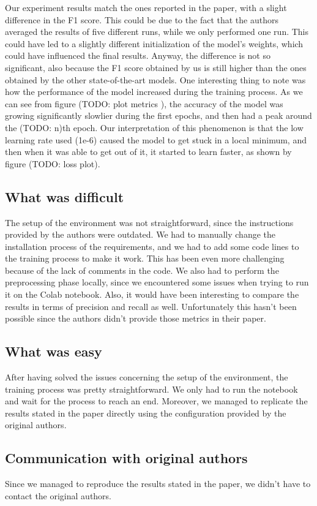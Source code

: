 Our experiment results match the ones reported in the paper, with a slight difference in the F1 score. This could be due to the fact that the authors averaged the results of five different runs, while we only performed one run. This could have led to a slightly different initialization of the model's weights, which could have influenced the final results. Anyway, the difference is not so significant, also because the F1 score obtained by us is still higher than the ones obtained by the other state-of-the-art models.
One interesting thing to note was how the performance of the model increased during the training process. As we can see from figure (TODO: plot metrics ), the accuracy of the model was growing significantly slowlier during the first epochs, and then had a peak around the (TODO: n)th epoch. Our interpretation of this phenomenon is that the low learning rate used (1e-6) caused the model to get stuck in a local minimum, and then when it was able to get out of it, it started to learn faster, as shown by figure (TODO: loss plot).

\subsection{What was difficult}

The setup of the environment was not straightforward, since the instructions provided by the authors were outdated. We had to manually change the installation process of the requirements, and we had to add some code lines to the training process to make it work. This has been even more challenging because of the lack of comments in the code.
 We also had to perform the preprocessing phase locally, since we encountered some issues when trying to run it on the Colab notebook. Also, it would have been interesting to compare the results in terms of precision and recall as well. Unfortunately this hasn't been possible since the authors didn't provide those metrics in their paper. 

\subsection{What was easy}
After having solved the issues concerning the setup of the environment, the training process was pretty straightforward. We only had to run the notebook and wait for the process to reach an end. Moreover, we managed to replicate the results stated in the paper directly using the configuration provided by the original authors. 



\subsection{Communication with original authors}
Since we managed to reproduce the results stated in the paper, we didn't have to contact the original authors.
